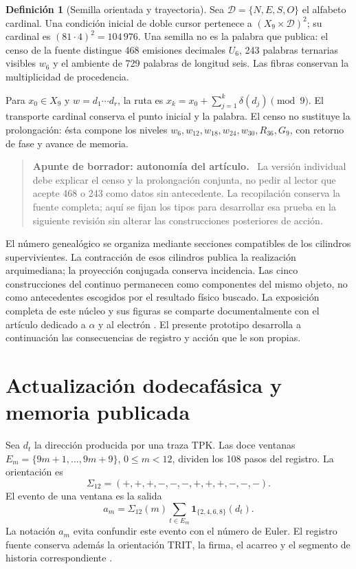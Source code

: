 \documentclass[11pt,a4paper]{article}
\numberwithin{equation}{section}
\theoremstyle{definition}
\newtheorem{definition}[theorem]{Definición}
\newenvironment{apunte}[1]{\par\Needspace{6\baselineskip}\smallskip
\begin{quote}\small\raggedright\color{ink}\noindent\textbf{Apunte de borrador: #1.}\ }
{\end{quote}\smallskip}
\begin{document}
\begin{definition}[Semilla orientada y trayectoria]
Sea $\mathscr D=\{N,E,S,O\}$ el alfabeto cardinal. Una condición inicial
de doble cursor pertenece a
$(X_9\times\mathscr D)^2$; su cardinal es
$(81\cdot4)^2=104\,976$. Una semilla no es la palabra que publica:
el censo de la fuente distingue 468 emisiones decimales $U_6$,
243 palabras ternarias visibles $w_6$ y el ambiente de 729 palabras
de longitud seis. Las fibras conservan la multiplicidad de procedencia.
\end{definition}
Para $x_0\in X_9$ y $w=d_1\cdots d_r$, la ruta es
$x_k=x_0+\sum_{j=1}^k\delta(d_j)\pmod9$.
El transporte cardinal conserva el punto inicial y la palabra.
El censo no sustituye la prolongación: ésta compone los niveles
$w_6,w_{12},w_{18},w_{24},w_{30},R_{36},G_9$,
con retorno de fase y avance de memoria.

\begin{apunte}{autonomía del artículo}
La versión individual debe explicar el censo y la prolongación conjunta,
no pedir al lector que acepte 468 o 243 como datos sin antecedente.
La recopilación conserva la fuente completa; aquí se fijan los tipos
para desarrollar esa prueba en la siguiente revisión sin alterar las
construcciones posteriores de acción.
\end{apunte}

El número genealógico se organiza mediante secciones compatibles de los
cilindros supervivientes. La contracción de esos cilindros publica la
realización arquimediana; la proyección conjugada conserva incidencia.
Las cinco construcciones del continuo permanecen como componentes del mismo
objeto, no como antecedentes escogidos por el resultado físico buscado.
La exposición completa de este núcleo y sus figuras se comparte
documentalmente con el artículo dedicado a $\alpha$ y al electrón
\cite{app,trit,tpk,witt}. El presente prototipo desarrolla a continuación
las consecuencias de registro y acción que le son propias.



\section{Actualización dodecafásica y memoria publicada}
\label{sec:eta}
Sea $d_t$ la dirección producida por una traza TPK. Las doce ventanas
$E_m=\{9m+1,\ldots,9m+9\}$, $0\le m<12$, dividen los 108 pasos del registro.
La orientación es
\[
\Sigma_{12}=(+,+,+,-,-,-,+,+,+,-,-,-).
\]
El evento de una ventana es la salida
\begin{equation}
a_m=\Sigma_{12}(m)
\sum_{t\in E_m}\mathbf1_{\{2,4,6,8\}}(d_t).
\label{eq:events}
\end{equation}
La notación $a_m$ evita confundir este evento con el número de Euler.
El registro fuente conserva además la orientación TRIT, la firma,
el acarreo y el segmento de historia correspondiente \cite{registro}.
\end{document}
